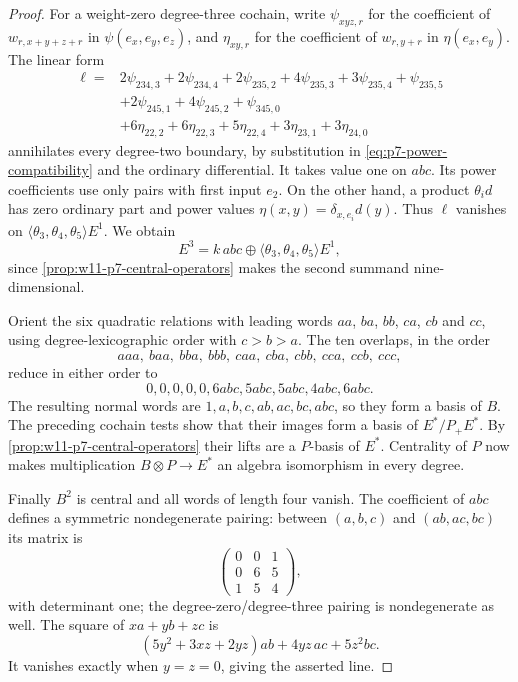 \documentclass[11pt,reqno]{amsart}
\theoremstyle{definition}
\theoremstyle{remark}
\theoremstyle{definition}
\begin{document}
\begin{proof}
For a weight-zero degree-three cochain, write $\psi_{xyz,r}$
for the coefficient of $w_{r,x+y+z+r}$ in $\psi(e_x,e_y,e_z)$,
and $\eta_{xy,r}$ for the coefficient of $w_{r,y+r}$ in
$\eta(e_x,e_y)$. The linear form
\[
\begin{aligned}
 \ell={}&2\psi_{234,3}+2\psi_{234,4}
 +2\psi_{235,2}+4\psi_{235,3}+3\psi_{235,4}+\psi_{235,5}\\
 &+2\psi_{245,1}+4\psi_{245,2}+\psi_{345,0}\\
 &+6\eta_{22,2}+6\eta_{22,3}+5\eta_{22,4}
 +3\eta_{23,1}+3\eta_{24,0}
\end{aligned}
\]
annihilates every degree-two boundary, by substitution in
\eqref{eq:p7-power-compatibility} and the ordinary differential.
It takes value one on $abc$.
Its power coefficients use only pairs with first input $e_2$.
On the other hand, a product $\theta_i d$ has zero ordinary part
and power values $\eta(x,y)=\delta_{x,e_i}d(y)$.
Thus $\ell$ vanishes on
$\langle\theta_3,\theta_4,\theta_5\rangle E^1$.
We obtain
\[
 E^3=k\,abc\oplus
 \langle\theta_3,\theta_4,\theta_5\rangle E^1,
\]
since \cref{prop:w11-p7-central-operators} makes the second
summand nine-dimensional.

Orient the six quadratic relations with leading words
$aa$, $ba$, $bb$, $ca$, $cb$ and $cc$, using degree-lexicographic order
with $c>b>a$.
The ten overlaps, in the order
\[
 aaa,\ baa,\ bba,\ bbb,\ caa,\ cba,\ cbb,\ cca,\ ccb,\ ccc,
\]
reduce in either order to
\[
 0,0,0,0,0,6abc,5abc,5abc,4abc,6abc.
\]
The resulting normal words are
$1,a,b,c,ab,ac,bc,abc$, so they form a basis of $B$.
The preceding cochain tests show that their images form a basis
of $E^*/P_+E^*$.
By \cref{prop:w11-p7-central-operators} their lifts are a
$P$-basis of $E^*$. Centrality of $P$ now makes multiplication
$B\otimes P\to E^*$ an algebra isomorphism in every degree.

Finally $B^2$ is central and all words of length four vanish.
The coefficient of $abc$ defines a symmetric nondegenerate pairing:
between $(a,b,c)$ and $(ab,ac,bc)$ its matrix is
\[
 \begin{pmatrix}0&0&1\\0&6&5\\1&5&4\end{pmatrix},
\]
with determinant one; the degree-zero/degree-three pairing is
nondegenerate as well. The square of $xa+yb+zc$ is
\[
 (5y^2+3xz+2yz)ab+4yz\,ac+5z^2bc.
\]
It vanishes exactly when $y=z=0$, giving the asserted line.
\end{proof}
\end{document}
